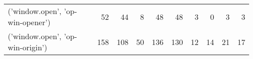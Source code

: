 \begin{tabular}{lrrrrrrrrr}
            ('window.open', 'op-win-opener') &                               52 &                                 44 &                                      8 &                           48 &                          48 &                                   3 &                                      0 &                             3 &                            3 \\
            ('window.open', 'op-win-origin') &                              158 &                                108 &                                     50 &                          136 &                         130 &                                  12 &                                     14 &                            21 &                           17 \\
\bottomrule
\end{tabular}
